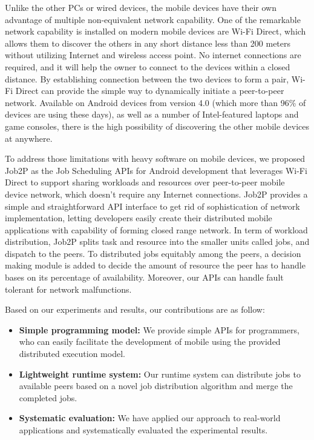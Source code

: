 \documentclass[conference]{IEEEtran}
\begin{document}
Unlike the other PCs or wired devices, the mobile devices have their own advantage of multiple non-equivalent network capability. One of the remarkable network capability is installed on modern mobile devices are Wi-Fi Direct, which allows them to discover the others in any short distance less than 200 meters without utilizing Internet and wireless access point. No internet connections are required, and it will help the owner to connect to the devices within a closed distance. By establishing connection between the two devices to form a pair, Wi-Fi Direct can provide the simple way to dynamically initiate a peer-to-peer network. Available on Android devices from version 4.0 (which more than 96\% of devices are using these days), as well as a number of Intel-featured laptops and game consoles, there is the high possibility of discovering the other mobile devices at anywhere.

To address those limitations with heavy software on mobile devices, we proposed Job2P as the Job Scheduling APIs for Android development that leverages Wi-Fi Direct to support sharing workloads and resources over peer-to-peer mobile device network, which doesn't require any Internet connections. Job2P provides a simple and straightforward API interface to get rid of sophistication of network implementation, letting developers easily create their distributed mobile applications with capability of forming closed range network. In term of workload distribution, Job2P splits task and resource into the smaller units called jobs, and dispatch to the peers. To distributed jobs equitably among the peers, a decision making module is added to decide the amount of resource the peer has to handle bases on its percentage of availability. Moreover, our APIs can handle fault tolerant for network malfunctions.

Based on our experiments and results, our contributions are as follow:
\begin{itemize}
	\item \textbf{Simple programming model:} We provide simple APIs for programmers, who can easily facilitate the development of mobile using the provided distributed execution model.
	\item \textbf{Lightweight runtime system:} Our runtime system can distribute jobs to available peers based on a novel job distribution algorithm and merge the completed jobs. 	
	\item \textbf{Systematic evaluation:} We have applied our approach to real-world applications and systematically evaluated the experimental results.
\end{itemize}
\end{document}
